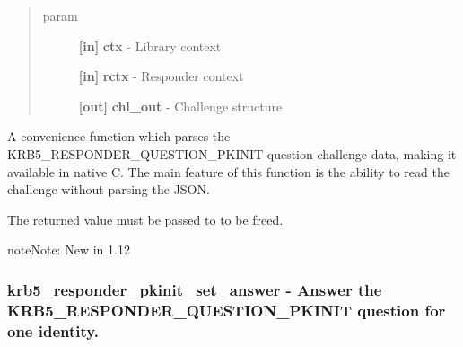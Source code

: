 \documentclass[letterpaper,10pt,english]{sphinxmanual}
\begin{document}
\begin{fulllineitems}
\label{appdev/refs/api/krb5_responder_pkinit_get_challenge:krb5_responder_pkinit_get_challenge}
\end{fulllineitems}

\begin{quote}\begin{description}
\item[{param}] \leavevmode
\textbf{{[}in{]}} \textbf{ctx} - Library context

\textbf{{[}in{]}} \textbf{rctx} - Responder context

\textbf{{[}out{]}} \textbf{chl\_out} - Challenge structure

\end{description}\end{quote}

A convenience function which parses the KRB5\_RESPONDER\_QUESTION\_PKINIT question challenge data, making it available in native C. The main feature of this function is the ability to read the challenge without parsing the JSON.

The returned value must be passed to {\hyperref[appdev/refs/api/krb5_responder_pkinit_challenge_free:krb5_responder_pkinit_challenge_free]{}} to be freed.

\begin{notice}{note}{Note:}
New in 1.12
\end{notice}


\subsubsection{krb5\_responder\_pkinit\_set\_answer -  Answer the KRB5\_RESPONDER\_QUESTION\_PKINIT question for one identity.}
\label{appdev/refs/api/krb5_responder_pkinit_set_answer:krb5-responder-pkinit-set-answer-answer-the-krb5-responder-question-pkinit-question-for-one-identity}\label{appdev/refs/api/krb5_responder_pkinit_set_answer::doc}
\end{document}
